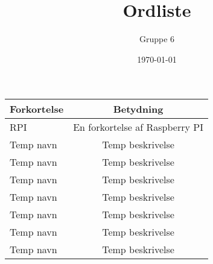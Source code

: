 \documentclass[a4paper, 12pt]{article}
\begin{document}
\title{Ordliste}
\author{Gruppe 6}
\date{\today}
\maketitle

\newpage

\centering
{\large
\begin{tabular}{l|c}
\textbf{Forkortelse} & \textbf{Betydning} \\
\hline
RPI & En forkortelse af Raspberry PI \\
Temp navn & Temp beskrivelse \\
Temp navn & Temp beskrivelse \\
Temp navn & Temp beskrivelse \\
Temp navn & Temp beskrivelse \\
Temp navn & Temp beskrivelse \\
Temp navn & Temp beskrivelse \\
Temp navn & Temp beskrivelse 
\end{tabular}
}
\end{document}
